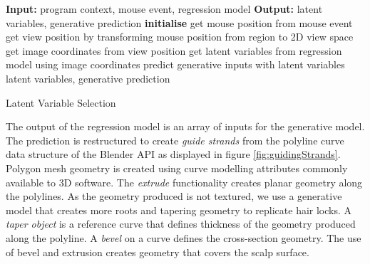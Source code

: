 \documentclass[ %
author={Dillon Keith Diep},
supervisor={Dr. Carl Henrik Ek},
degree={MEng},
title={ART-CG Hair:},
subtitle={Assisted Real-time Content Generation of Stylised Virtual Hair},
type={Research},
year={2017} ]{dissertation}
\begin{document}
\begin{algorithm}[!h]
	\algrule
	\textbf{Input:} program context, mouse event, regression model\;
	\textbf{Output:} latent variables, generative prediction\;
	\algrule
	\textbf{initialise}\;
	{
		get mouse position from mouse event\;
		get view position by transforming mouse position from region to 2D view space\;
		get image coordinates from view position\;
		get latent variables from regression model using image coordinates\;
		predict generative inputs with latent variables\;
	}
	\Return latent variables, generative prediction
	\caption{Latent Variable Selection}
\end{algorithm}

The output of the regression model is an array of inputs for the generative model. The prediction is restructured to create \textit{guide strands} from the polyline curve data structure of the Blender API as displayed in figure \ref{fig:guidingStrands}. Polygon mesh geometry is created using curve modelling attributes commonly available to 3D software. The \textit{extrude} functionality creates planar geometry along the polylines. As the geometry produced is not textured, we use a generative model that creates more roots and tapering geometry to replicate hair locks.
A \textit{taper object} is a reference curve that defines thickness of the geometry produced along the polyline. A \textit{bevel} on a curve defines the cross-section geometry. The use of bevel and extrusion creates geometry that covers the scalp surface.
\end{document}
